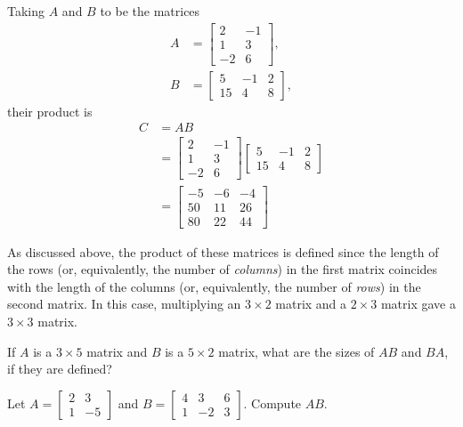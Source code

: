 \documentclass[12pt,letterpaper,reqno]{article}
\numberwithin{equation}{section}
\begin{document}
\begin{example}
Taking $A$ and $B$ to be the matrices
\begin{align*}
	A&=\begin{bmatrix}
			2&-1\\1&3\\-2&6
		\end{bmatrix}, \\
	B&=	\begin{bmatrix}
		5&-1&2 \\ 15&4&8
	\end{bmatrix},
\end{align*}
their product is  
\begin{align*}
	C&=AB \\
	&=\begin{bmatrix}
			2&-1\\1&3\\-2&6
		\end{bmatrix}\begin{bmatrix}
		5&-1&2 \\ 15&4&8
	\end{bmatrix} \\
	&=\begin{bmatrix}
		-5&-6&-4 \\
		50&11&26 \\
		80&22&44
	\end{bmatrix}
\end{align*}
\end{example}

As discussed above, the product of these matrices is defined since the length of the rows (or, equivalently, the number of \emph{columns}) in the first matrix coincides with the length of the columns (or, equivalently, the number of \emph{rows}) in the second matrix. In this case, multiplying an $3 \times 2$ matrix and a $2 \times 3$ matrix gave a $3 \times 3$ matrix.

\begin{exercise}
	If $A$ is a $3 \times 5$ matrix and $B$ is a $5 \times 2$ matrix, what are the sizes of $AB$ and $BA$, if they are defined?	
\end{exercise}

\begin{exercise}
Let $A=\begin{bmatrix}
	2&3\\1&-5
\end{bmatrix}$ and $B=\begin{bmatrix}
	4&3&6 \\1&-2&3
\end{bmatrix}$. Compute $AB$.	
\end{exercise}
\end{document}

